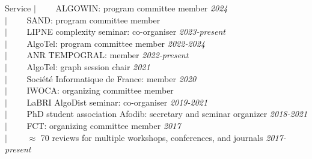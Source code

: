 \documentclass[french]{resume} %
\begin{document}
	\begin{rSection}{Service} %
		$| \qquad$ ALGOWIN: program committee member \hfill {\em 2024} \\
		$| \qquad$ SAND: program committee member \\
		$| \qquad$ LIPNE complexity seminar: co-organiser \hfill {\em 2023-present}\\
		$| \qquad$ AlgoTel: program committee member \hfill {\em 2022-2024} \\
		$| \qquad$ ANR TEMPOGRAL: member \hfill {\em 2022-present} \\
		$| \qquad$ AlgoTel: graph session chair \hfill {\em 2021} \\
		$| \qquad$ Société Informatique de France: member \hfill {\em 2020} \\
		$| \qquad$ IWOCA: organizing committee member \\
		$| \qquad$ LaBRI AlgoDist seminar: co-organiser \hfill {\em 2019-2021}\\
		$| \qquad$ PhD student association Afodib: secretary and seminar organizer \hfill {\em 2018-2021}\\
		$| \qquad$ FCT: organizing committee member \hfill {\em 2017}\\
		$| \qquad$ $\approx$ 70 reviews for multiple workshops, conferences, and journals \hfill {\em 2017-present}\\
	\end{rSection}
\end{document}
